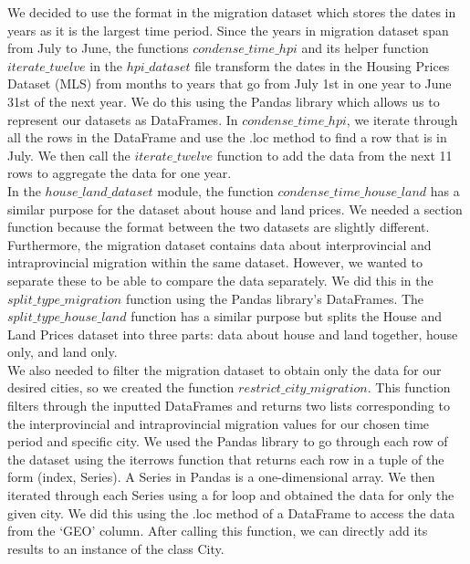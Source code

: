 \documentclass[fontsize=11pt]{article}
\begin{document}
We decided to use the format in the migration dataset which stores the dates in years as it is the largest time period. Since the years in migration dataset span from July to June, the functions $condense\_time\_hpi$ and its helper function $iterate\_twelve$ in the $hpi\_dataset$ file transform the dates in the Housing Prices Dataset (MLS) from months to years that go from July 1st in one year to June 31st of the next year. We do this using the Pandas library which allows us to represent our datasets as DataFrames. In $condense\_time\_hpi$, we iterate through all the rows in the DataFrame and use the .loc method to find a row that is in July. We then call the $iterate\_twelve$ function to add the data from the next 11 rows to aggregate the data for one year.  \\

In the $house\_land\_dataset$ module, the function $condense\_time\_house\_land$ has a similar purpose for the dataset about house and land prices. We needed a section function because the format between the two datasets are slightly different.\\

Furthermore, the migration dataset contains data about interprovincial and intraprovincial migration within the same dataset. However, we wanted to separate these to be able to compare the data separately. We did this in the $split\_type\_migration$ function using the Pandas library’s DataFrames. The $split\_type\_house\_land$ function has a similar purpose but splits the House and Land Prices dataset into three parts: data about house and land together, house only, and land only. \\

We also needed to filter the migration dataset to obtain only the data for our desired cities, so we created the function $restrict\_city\_migration$. This function filters through the inputted DataFrames and returns two lists corresponding to the interprovincial and intraprovincial migration values for our chosen time period and specific city. We used the Pandas library to go through each row of the dataset using the iterrows function that returns each row in a tuple of the form (index, Series). A Series in Pandas is a one-dimensional array. We then iterated through each Series using a for loop and obtained the data for only the given city. We did this using the .loc method of a DataFrame to access the data from the ‘GEO’ column. After calling this function, we can directly add its results to an instance of the class City. \\
\end{document}
